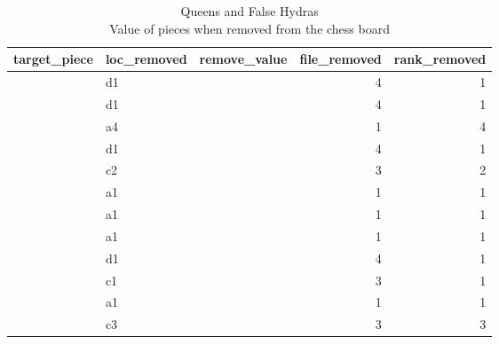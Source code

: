 \documentclass[
]{article}
\begin{document}
\begin{table}[!t]
\caption*{
{\large Queens and False Hydras} \\ 
{\small Value of pieces when removed from the chess board}
} 
\fontsize{12.0pt}{14.4pt}\selectfont
\begin{tabular*}{\linewidth}{@{\extracolsep{\fill}}llrrr}
\toprule
target\_piece & loc\_removed & remove\_value & file\_removed & rank\_removed \\ 
\midrule\addlinespace[2.5pt]
{\cellcolor[HTML]{0000FF}{\textcolor[HTML]{FFFFFF}{Q}}} & {d1} & {\cellcolor[HTML]{8888FF}{\textcolor[HTML]{FFFFFF}{1322}}} & {4} & {1} \\ 
{\cellcolor[HTML]{0000FF}{\textcolor[HTML]{FFFFFF}{Q}}} & {d1} & {\cellcolor[HTML]{8889FF}{\textcolor[HTML]{FFFFFF}{1316}}} & {4} & {1} \\ 
{\cellcolor[HTML]{0000FF}{\textcolor[HTML]{FFFFFF}{Q}}} & {a4} & {\cellcolor[HTML]{858DFF}{\textcolor[HTML]{FFFFFF}{1263}}} & {1} & {4} \\ 
{\cellcolor[HTML]{0000FF}{\textcolor[HTML]{FFFFFF}{Q}}} & {d1} & {\cellcolor[HTML]{7E96FF}{\textcolor[HTML]{FFFFFF}{1154}}} & {4} & {1} \\ 
{\cellcolor[HTML]{0000FF}{\textcolor[HTML]{FFFFFF}{Q}}} & {c2} & {\cellcolor[HTML]{5DB5FF}{\textcolor[HTML]{000000}{769}}} & {3} & {2} \\ 
{\cellcolor[HTML]{FF00FF}{\textcolor[HTML]{FFFFFF}{R}}} & {a1} & {\cellcolor[HTML]{54BBFF}{\textcolor[HTML]{000000}{691}}} & {1} & {1} \\ 
{\cellcolor[HTML]{FF00FF}{\textcolor[HTML]{FFFFFF}{R}}} & {a1} & {\cellcolor[HTML]{51BCFF}{\textcolor[HTML]{000000}{671}}} & {1} & {1} \\ 
{\cellcolor[HTML]{FF00FF}{\textcolor[HTML]{FFFFFF}{R}}} & {a1} & {\cellcolor[HTML]{50BCFF}{\textcolor[HTML]{000000}{668}}} & {1} & {1} \\ 
{\cellcolor[HTML]{FF00FF}{\textcolor[HTML]{FFFFFF}{R}}} & {d1} & {\cellcolor[HTML]{4FBDFF}{\textcolor[HTML]{000000}{661}}} & {4} & {1} \\ 
{\cellcolor[HTML]{FF0000}{\textcolor[HTML]{FFFFFF}{B}}} & {c1} & {\cellcolor[HTML]{4CBFFF}{\textcolor[HTML]{000000}{639}}} & {3} & {1} \\ 
{\cellcolor[HTML]{FF00FF}{\textcolor[HTML]{FFFFFF}{R}}} & {a1} & {\cellcolor[HTML]{4AC0FF}{\textcolor[HTML]{000000}{626}}} & {1} & {1} \\ 
{\cellcolor[HTML]{00FF00}{\textcolor[HTML]{000000}{N}}} & {c3} & {\cellcolor[HTML]{44C2FF}{\textcolor[HTML]{000000}{594}}} & {3} & {3} \\ 

\end{tabular*}
\end{table}
\end{document}
